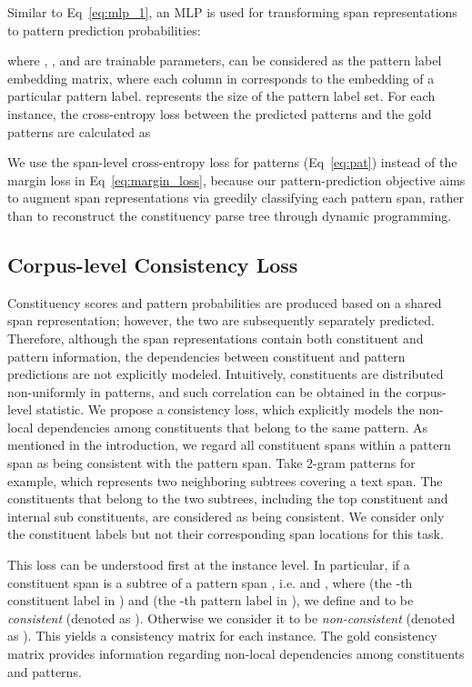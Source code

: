 \documentclass[11pt]{article}
\begin{document}
Similar to Eq~\ref{eq:mlp_1}, an MLP is used for transforming span representations to pattern prediction probabilities: 

where , ,  and  are trainable parameters,   can be considered as the pattern label embedding matrix, where each column in  corresponds to the embedding of a particular pattern label.  represents the size of the pattern label set.
For each instance, the cross-entropy loss between the predicted patterns and the gold patterns are calculated as


We use the span-level cross-entropy loss for patterns (Eq~\ref{eq:pat}) instead of the margin loss in Eq~\ref{eq:margin_loss}, because our pattern-prediction objective aims to augment span representations via greedily classifying each pattern span, rather than to reconstruct the constituency parse tree through dynamic programming. 


\subsection{Corpus-level Consistency Loss}
\label{sec:consistency_loss}
Constituency scores and pattern probabilities are produced based on a shared span representation; however, the two are subsequently separately predicted. 
Therefore, although the span representations contain both constituent and pattern information, the dependencies between constituent and pattern predictions are not explicitly modeled. 
Intuitively, constituents are distributed non-uniformly in patterns, and such correlation can be obtained in the corpus-level statistic. We propose a consistency loss, which explicitly models the non-local dependencies among constituents that belong to the same pattern. As mentioned in the introduction, we regard all constituent spans within a pattern span as being consistent with the pattern span. Take 2-gram patterns for example, which represents two neighboring subtrees covering a text span. The constituents that belong to the two subtrees, including the top constituent and internal sub constituents, are considered as being consistent. We consider only the constituent labels but not their corresponding span locations for this task.

This loss can be understood first at the instance level.
In particular, if a constituent span  is a subtree of a pattern span , i.e.  and , 
where  (the -th constituent label in ) and  (the -th pattern label in ),
we define  and  to be {\it consistent} (denoted as ). 
Otherwise we consider it to be {\it non-consistent} (denoted as ). 
This yields a consistency matrix  for each instance. 
The gold consistency matrix  provides information regarding non-local dependencies among constituents and patterns. 
\end{document}
